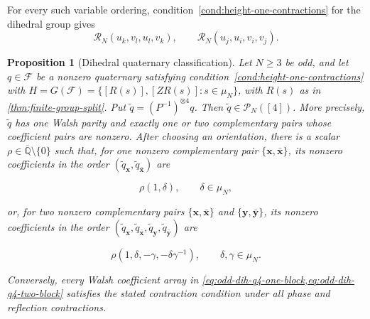 \documentclass[11pt,letterpaper,onecolumn]{article}
\theoremstyle{plain}
\newtheorem{proposition}[proposition]{Proposition}
\theoremstyle{definition}
\theoremstyle{remark}
\newcommand{\AlgNums}{\overline{\mathbb Q}}
\newcommand{\cF}{\mathcal F}
\begin{document}
	For every such variable ordering, condition~\ref{cond:height-one-contractions}
	for the dihedral group gives
	\[
	\mathcal R_N(u_k,v_l,u_l,v_k),
	\qquad
	\mathcal R_N(u_j,u_i,v_i,v_j).
	\]
	
	\begin{proposition}[Dihedral quaternary classification]
		\label{prop:odd-dih-q4}
		Let \(N\ge3\) be odd, and let \(q\in\cF\) be a nonzero quaternary
		satisfying condition~\ref{cond:height-one-contractions} with
		\(H=G(\cF)=\{[R(s)],[ZR(s)]:s\in\mu_N\}\), with \(R(s)\) as in \cref{thm:finite-group-split}.  Put
		\(\widetilde q=(P^{-1})^{\otimes4}q\).  Then
		\(\widetilde q\in\mathcal P_N([4])\).  More precisely,
		\(\widetilde q\) has one Walsh parity and exactly one or two complementary
		pairs whose coefficient pairs are nonzero.  After choosing an orientation, there is a scalar
		\(\rho\in\AlgNums\setminus\{0\}\) such that, for one nonzero complementary
		pair \(\{{\mathbf x},\bar {\mathbf x}\}\), its nonzero coefficients in the order
		\((\widetilde q_{\mathbf x},\widetilde q_{\bar {\mathbf x}})\) are
		
		\begin{equation}
			\rho(1,\delta),
			\qquad \delta\in\mu_N,
			\label{eq:odd-dih-q4-one-block}
		\end{equation}
		
		or, for two nonzero complementary pairs \(\{{\mathbf x},\bar {\mathbf x}\}\) and
		\(\{{\mathbf y},\bar {\mathbf y}\}\), its nonzero coefficients in the order
		\((\widetilde q_{\mathbf x},\widetilde q_{\bar {\mathbf x}},
		\widetilde q_{\mathbf y},\widetilde q_{\bar {\mathbf y}})\) are
		
		\begin{equation}
			\rho(1,\delta,-\gamma,-\delta\gamma^{-1}),
			\qquad \delta,\gamma\in\mu_N.
			\label{eq:odd-dih-q4-two-block}
		\end{equation}
		
		Conversely, every Walsh coefficient array in
		\cref{eq:odd-dih-q4-one-block,eq:odd-dih-q4-two-block} satisfies the
		stated contraction condition under all phase and reflection contractions.
	\end{proposition}
	
\end{document}
